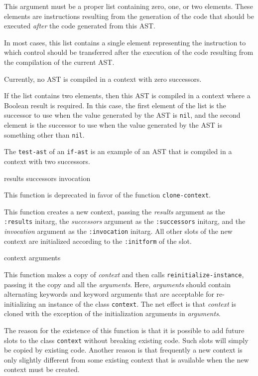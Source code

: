 

This argument must be a proper list containing zero, one, or two
elements.  These elements are instructions resulting from the
generation of the code that should be executed \emph{after} the code
generated from this AST.

In most cases, this list contains a single element representing the
instruction to which control should be transferred after the execution
of the code resulting from the compilation of the current AST.

Currently, no AST is compiled in a context with zero successors.

If the list contains two elements, then this AST is compiled in a
context where a Boolean result is required.  In this case, the first
element of the list is the successor to use when the value generated
by the AST is \texttt{nil}, and the second element is the successor to
use when the value generated by the AST is something other than
\texttt{nil}.

The \texttt{test-ast} of an \texttt{if-ast} is an example of an AST
that is compiled in a context with two successors.






 {results successors invocation}

This function is deprecated in favor of the function
\texttt{clone-context}.

This function creates a new context, passing the \textit{results}
argument as the \texttt{:results} initarg, the \textit{successors}
argument as the \texttt{:successors} initarg, and the
\textit{invocation} argument as the \texttt{:invocation} initarg.
All other slots of the new context are initialized according to the
\texttt{:initform} of the slot.

 {context \rest arguments}

This function makes a copy of \textit{context} and then calls
\texttt{reinitialize-instance}, passing it the copy and all the
\textit{arguments}.  Here, \textit{arguments} should contain
alternating keywords and keyword arguments that are acceptable for
re-initializing an instance of the class \texttt{context}.  The net
effect is that \textit{context} is cloned with the exception of the
initialization arguments in \textit{arguments}.

The reason for the existence of this function is that it is possible
to add future slots to the class \texttt{context} without breaking
existing code.  Such slots will simply be copied by existing code.
Another reason is that frequently a new context is only slightly
different from some existing context that is available when the new
context must be created.
